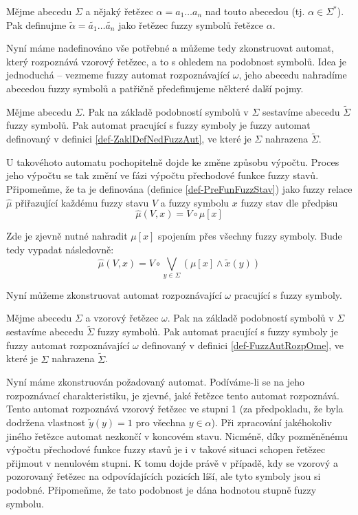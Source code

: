 \documentclass[a4paper,10pt]{article}
\begin{document}
\begin{definition}
Mějme abecedu $\Sigma$ a nějaký řetězec $\alpha = a_1 \dots a_n$ nad touto abecedou (tj. $\alpha \in \Sigma^*$). Pak definujme $\widetilde{\alpha} = \widetilde{a_1} \dots \widetilde{a_n}$ jako řetězec fuzzy symbolů řetězce $\alpha$.
\end{definition}

Nyní máme nadefinováno vše potřebné a můžeme tedy zkonstruovat automat, který rozpoznává vzorový řetězec, a to s ohledem na podobnost symbolů. Idea je jednoduchá -- vezmeme fuzzy automat rozpoznávající $\omega$, jeho abecedu nahradíme abecedou fuzzy symbolů a patřičně předefinujeme některé další pojmy.

\begin{definition}
  Mějme abecedu $\Sigma$. Pak na základě podobností symbolů v $\Sigma$ sestavíme abecedu $\widetilde{\Sigma}$ fuzzy symbolů. Pak automat pracující s fuzzy symboly je fuzzy automat definovaný v definici \ref{def-ZaklDefNedFuzzAut}, ve které je $\Sigma$ nahrazena $\widetilde{\Sigma}$.
\end{definition}

U takovéhoto automatu pochopitelně dojde ke změne způsobu výpočtu. Proces jeho výpočtu se tak změní ve fázi výpočtu přechodové funkce fuzzy stavů. Připomeňme, že ta je definována (definice \ref{def-PreFunFuzzStav}) jako fuzzy relace $\widehat{\mu}$ přiřazující každému fuzzy stavu $V$ a fuzzy symbolu $x$ fuzzy stav dle předpisu
$$
 \widehat{\mu}(V, x) = V \circ \mu[x]
$$

Zde je zjevně nutné nahradit $\mu[x]$ spojením přes všechny fuzzy symboly. Bude tedy vypadat následovně:
$$
 \widehat{\mu}(V, x) = V \circ \bigvee_{y \in \Sigma} (\mu[x] \wedge \widetilde{x}(y))
$$

Nyní můžeme zkonstruovat automat rozpoznávající $\omega$ pracující s fuzzy symboly.
\begin{definition}
  Mějme abecedu $\Sigma$ a vzorový řetězec $\omega$. Pak na základě podobností symbolů v $\Sigma$ sestavíme abecedu $\widetilde{\Sigma}$ fuzzy symbolů. Pak automat pracující s fuzzy symboly je fuzzy automat rozpoznávající $\omega$ definovaný v definici \ref{def-FuzzAutRozpOme}, ve které je $\Sigma$ nahrazena $\widetilde{\Sigma}$.
\end{definition}

Nyní máme zkonstruován požadovaný automat. Podíváme-li se na jeho rozpoznávací charakteristiku, je zjevné, jaké řetězce tento automat rozpoznává. Tento automat rozpoznává vzorový řetězec ve stupni 1 (za předpokladu, že byla dodržena vlastnost $\widetilde{y}(y) = 1$ pro všechna $y \in \alpha$). Při zpracování jakéhokoliv jiného řetězce automat nezkončí v koncovém stavu. Nicméně, díky pozměněnému výpočtu přechodové funkce fuzzy stavů je i v takové situaci schopen řetězec přijmout v nenulovém stupni. K tomu dojde právě v případě, kdy se vzorový a pozorovaný řetězec na odpovídajících pozicích líší, ale tyto symboly jsou si podobné. Připomeňme, že tato podobnost je dána hodnotou stupně fuzzy symbolu.
\end{document}
